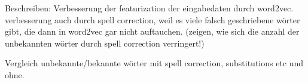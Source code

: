 Beschreiben: Verbesserung der featurization der eingabedaten durch word2vec. verbesserung auch durch spell correction, weil es viele falsch geschriebene wörter gibt, die dann in word2vec gar nicht auftauchen. (zeigen, wie sich die anzahl der unbekannten wörter durch spell correction verringert!)

Vergleich unbekannte/bekannte wörter mit spell correction, substitutions etc und ohne.

